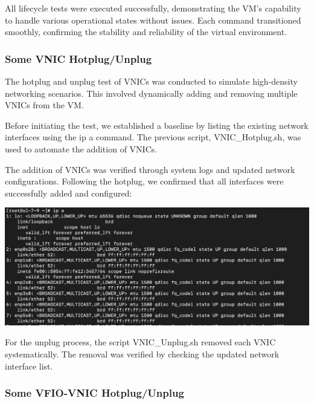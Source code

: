 All lifecycle tests were executed successfully, demonstrating the VM's capability to handle various operational states without issues. Each command transitioned smoothly, confirming the stability and reliability of the virtual environment.

\subsubsection[Some VNIC Hotplug/Unplug]{Some VNIC Hotplug/Unplug}

The hotplug and unplug test of VNICs was conducted to simulate high-density networking scenarios. This involved dynamically adding and removing multiple VNICs from the VM.\mynewline

Before initiating the test, we established a baseline by listing the existing network interfaces using the ip a command. The previous script, VNIC\_Hotplug.sh, was used to automate the addition of VNICs.\mynewline

The addition of VNICs was verified through system logs and updated network configurations. Following the hotplug, we confirmed that all interfaces were successfully added and configured:

\begin{center}
    \centering
    \includegraphics[width=\textwidth]{Images/ip a after VNIC Hotplug 2.png}
    \label{fig:casa}
\end{center}

For the unplug process, the script VNIC\_Unplug.sh removed each VNIC systematically. The removal was verified by checking the updated network interface list.

\subsubsection[Some VFIO-VNIC Hotplug/Unplug]{Some VFIO-VNIC Hotplug/Unplug}

